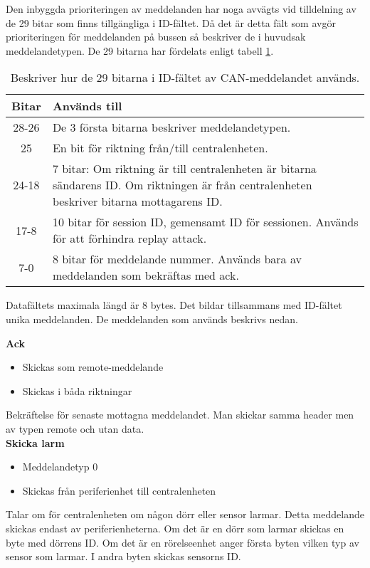 Den inbyggda prioriteringen av meddelanden har noga avvägts vid tilldelning av de 29 bitar som finns tillgängliga i ID-fältet.
Då det är detta fält som avgör prioriteringen för meddelanden på bussen så beskriver de i huvudsak meddelandetypen.
De 29 bitarna har fördelats enligt tabell \ref{tab:idbitar}.

\begin{table}[H]
	\centering
	\begin{tabular}{|c|p{}|}
		\hline
		Bitar 	& Används till \\ \hline \hline
		28-26		& De 3 första bitarna beskriver meddelandetypen. \\ \hline
		25		& En bit för riktning från/till centralenheten. \\ \hline
		24-18	& 7 bitar:
		Om riktning är till centralenheten är bitarna sändarens ID.
		Om riktningen är från centralenheten beskriver bitarna mottagarens ID. \\ \hline
		17-8 & 10 bitar för session ID, gemensamt ID för sessionen. Används för att förhindra replay attack. \\ \hline
		7-0 & 8 bitar för meddelande nummer. Används bara av meddelanden som bekräftas med ack. \\ \hline

	\end{tabular}
	\caption{Beskriver hur de 29 bitarna i ID-fältet av CAN-meddelandet används.}
	\label{tab:idbitar}
\end{table}


Datafältets maximala längd är 8 bytes. Det bildar tillsammans med ID-fältet unika meddelanden. De meddelanden som används beskrivs nedan.



\textbf{Ack}
\begin{itemize}
    \item Skickas som remote-meddelande
    \item Skickas i båda riktningar
\end{itemize}
Bekräftelse för senaste mottagna meddelandet. Man skickar samma header men av typen remote och utan data. \\


\textbf{Skicka larm}
\begin{itemize}
    \item Meddelandetyp 0
    \item Skickas från periferienhet till centralenheten
\end{itemize}
Talar om för centralenheten om någon dörr eller sensor larmar. Detta meddelande skickas endast av periferienheterna. Om det är en dörr som larmar skickas en byte med dörrens ID. Om det är en rörelseenhet anger första byten vilken typ av sensor som larmar. I andra byten skickas sensorns ID.\\


